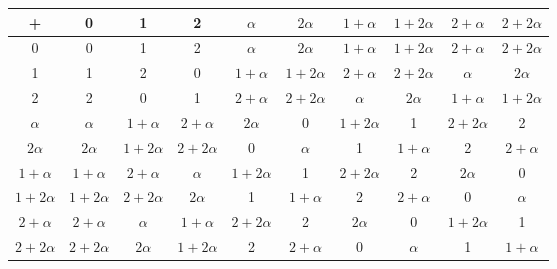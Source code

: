 \documentclass{article}
\begin{document}
\begin{center}
    \begin{tabular}{c||c|c|c|c|c|c|c|c|c}
        + & 0 & 1 & 2 & $\alpha$ & $2\alpha$ & $1 + \alpha$ & $1 + 2\alpha$ & $2 + \alpha$ & $2 + 2\alpha$ \\
        \hline\hline
        0 & 0 & 1 & 2 & $\alpha$ & $2\alpha$ & $1 + \alpha$ & $1 + 2\alpha$ & $2 + \alpha$ & $2 + 2\alpha$ \\
        \hline
        1 & 1 & 2 & 0 & $1 + \alpha$ & $1 + 2\alpha$ & $2 + \alpha$ & $2 + 2\alpha$ & $\alpha$ & $2\alpha$ \\
        \hline
        2 & 2 & 0 & 1 & $2 + \alpha$ & $2 + 2\alpha$ & $\alpha$ & $2\alpha$ & $1 + \alpha$ & $1 + 2\alpha$ \\
        \hline
        $\alpha$ & $\alpha$ & $1 + \alpha$ & $2 + \alpha$ & $2\alpha$ & 0 & $1 + 2\alpha$ & 1 & $2 + 2\alpha$ & 2 \\
        \hline
        $2\alpha$ & $2\alpha$ & $1 + 2\alpha$ & $2 + 2\alpha$ & 0 & $\alpha$ & 1 & $1 + \alpha$ & 2 & $2 + \alpha$ \\
        \hline
        $1 + \alpha$ & $1 + \alpha$ & $2 + \alpha$ & $\alpha$ & $1 + 2\alpha$ & 1 & $2 + 2\alpha$ & 2 & $2\alpha$ & 0 \\
        \hline
        $1 + 2\alpha$ & $1 + 2\alpha$ & $2 + 2\alpha$ & $2\alpha$ & 1 & $1 + \alpha$ & 2 & $2 + \alpha$ & 0 & $\alpha$ \\
        \hline
        $2 + \alpha$ & $2 + \alpha$ & $\alpha$ & $1 + \alpha$ & $2 + 2\alpha$ & 2 & $2\alpha$ & 0 & $1 + 2\alpha$ & 1 \\
        \hline
        $2 + 2\alpha$ & $2 + 2\alpha$ & $2\alpha$ & $1 + 2\alpha$ & 2 & $2 + \alpha$ & 0 & $\alpha$ & 1 & $1 + \alpha$ \\
    \end{tabular}


\end{center}
\end{document}
